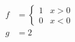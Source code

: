 \begin{align}
  f & = \begin{cases}
          1 & x > 0 \\
          0 & x < 0
        \end{cases} \\
  g & = 2
\end{align}
